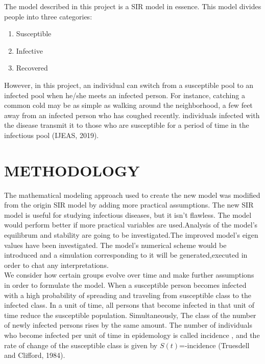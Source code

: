 \documentclass[12pt]{report}
\newcommand{\NI}{\noindent}
\begin{document}
	\NI The model described in this project is a SIR model in essence. This model divides people into three categories:
	\begin{enumerate}
		\item Susceptible
		\item Infective
		\item Recovered
	\end{enumerate}
	\newpage
	\NI However, in this project, an individual can switch from a susceptible pool to an infected pool when he/she meets an infected person. For instance, catching a common cold may be as simple as walking around the neighborhood, a few feet away from an infected person who has coughed recently. individuals infected with the disease transmit it to those who are susceptible for a period of time in the infectious pool (IJEAS, 2019).
   
   
   \chapter{METHODOLOGY}
   The mathematical modeling approach used to create the new model was modified from the origin SIR model by adding more practical assumptions. The new SIR model is useful for studying infectious diseases, but it isn't flawless. The model would perform better if more practical variables are used.Analysis of the model's equilibrum and stability are going to be investigated.The improved model's eigen values have been investigated. The model's numerical scheme would be introduced and a simulation corresponding to it will be generated,executed in order to chat any interpretations.\\
   
   \NI We consider how certain groups evolve over time and make further assumptions in order to formulate the model. When a susceptible person becomes infected with a high probability of spreading and traveling from susceptible class to the infected class. In a unit of time, all persons that become infected in that unit of time reduce the susceptible  population. Simultaneously, The class of the number of newly infected persons rises by the same amount. The number of individuals who become infected per unit of time in epidemology is called incidence , and the rate of change of the susceptible class is given by $S(t)$=-incidence (Truesdell and Clifford, 1984).\\
   
\end{document}
